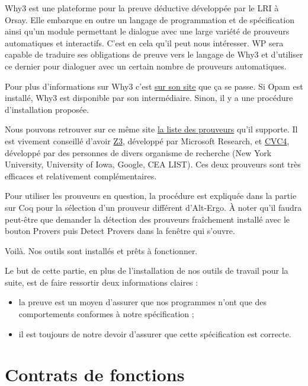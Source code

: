 \documentclass[12pt,francais,]{scrbook}
\providecommand{\tightlist}{%
  \setlength{\itemsep}{0pt}\setlength{\parskip}{0pt}}
\begin{document}
Why3 est une plateforme pour la preuve déductive développée par le LRI à
Orsay. Elle embarque en outre un langage de programmation et de
spécification ainsi qu'un module permettant le dialogue avec une large
variété de prouveurs automatiques et interactifs. C'est en cela qu'il
peut nous intéresser. WP sera capable de traduire ses obligations de
preuve vers le langage de Why3 et d'utiliser ce dernier pour dialoguer
avec un certain nombre de prouveurs automatiques.

Pour plus d'informations sur Why3 c'est \href{http://why3.lri.fr/}{sur
son site} que ça se passe. Si Opam est installé, Why3 est disponible par
son intermédiaire. Sinon, il y a une procédure d'installation proposée.

Nous pouvons retrouver sur ce même site
\href{http://why3.lri.fr/\#provers}{la liste des prouveurs} qu'il
supporte. Il est vivement conseillé d'avoir
\href{https://github.com/Z3Prover/z3/wiki}{Z3}, développé par Microsoft
Research, et \href{http://cvc4.cs.nyu.edu/web/}{CVC4}, développé par des
personnes de divers organisme de recherche (New York University,
University of Iowa, Google, CEA LIST). Ces deux prouveurs sont très
efficaces et relativement complémentaires.

Pour utiliser les prouveurs en question, la procédure est expliquée dans
la partie sur Coq pour la sélection d'un prouveur différent d'Alt-Ergo.
À noter qu'il faudra peut-être que demander la détection des prouveurs
fraîchement installé avec le bouton \og{}Provers\fg{} puis \og{}Detect Provers\fg{}
dans la fenêtre qui s'ouvre.

Voilà. Nos outils sont installés et prêts à fonctionner.

Le but de cette partie, en plus de l'installation de nos outils de
travail pour la suite, est de faire ressortir deux informations claires
:

\begin{itemize}
\tightlist
\item
  la preuve est un moyen d'assurer que nos programmes n'ont que des
  comportements conformes à notre spécification ;
\item
  il est toujours de notre devoir d'assurer que cette spécification est
  correcte.
\end{itemize}

\chapter{Contrats de fonctions}\label{contrats-de-fonctions}
\end{document}
